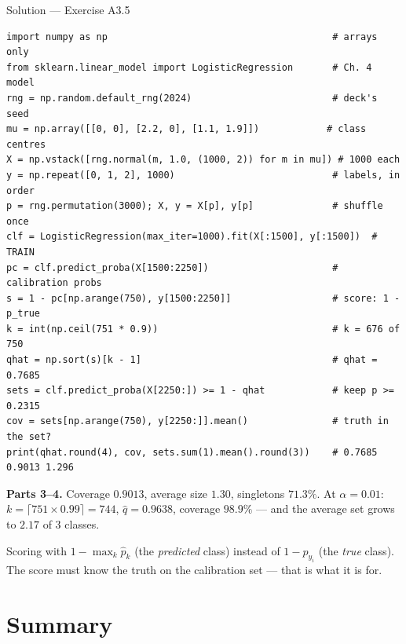 \documentclass[aspectratio=169,11pt]{beamer}
\begin{document}
\begin{frame}[fragile]{Solution --- Exercise A3.5}
\scriptsize
\begin{solutionbox}
\begin{lstlisting}[basicstyle=\ttfamily\fontsize{6.5}{7.2}\selectfont,aboveskip=2pt,belowskip=0pt]
import numpy as np                                        # arrays only
from sklearn.linear_model import LogisticRegression       # Ch. 4 model
rng = np.random.default_rng(2024)                         # deck's seed
mu = np.array([[0, 0], [2.2, 0], [1.1, 1.9]])            # class centres
X = np.vstack([rng.normal(m, 1.0, (1000, 2)) for m in mu]) # 1000 each
y = np.repeat([0, 1, 2], 1000)                            # labels, in order
p = rng.permutation(3000); X, y = X[p], y[p]              # shuffle once
clf = LogisticRegression(max_iter=1000).fit(X[:1500], y[:1500])  # TRAIN
pc = clf.predict_proba(X[1500:2250])                      # calibration probs
s = 1 - pc[np.arange(750), y[1500:2250]]                  # score: 1 - p_true
k = int(np.ceil(751 * 0.9))                               # k = 676 of 750
qhat = np.sort(s)[k - 1]                                  # qhat = 0.7685
sets = clf.predict_proba(X[2250:]) >= 1 - qhat            # keep p >= 0.2315
cov = sets[np.arange(750), y[2250:]].mean()               # truth in the set?
print(qhat.round(4), cov, sets.sum(1).mean().round(3))    # 0.7685 0.9013 1.296
\end{lstlisting}
  {\scriptsize \textbf{Parts 3--4.} Coverage $0.9013$, average size $1.30$, singletons $71.3\%$.
  At $\alpha = 0.01$: $k = \lceil 751 \times 0.99 \rceil = 744$, $\hat q = 0.9638$,
  coverage $98.9\%$ --- and the average set grows to $2.17$ of 3 classes.\par}
\end{solutionbox}
\begin{mistake}
  \scriptsize
  Scoring with $1 - \max_k \hat p_k$ (the \emph{predicted} class) instead of
  $1 - \hat p_{y_i}$ (the \emph{true} class). The score must know the truth on the
  calibration set --- that is what it is for.
\end{mistake}
\end{frame}

\section{Summary}
\end{document}
